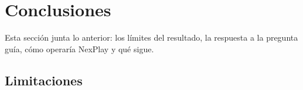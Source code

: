 \section{Conclusiones}\label{sec:conclusiones}

Esta sección junta lo anterior: los límites del resultado, la respuesta a la pregunta guía, cómo
operaría NexPlay y qué sigue.

\subsection{Limitaciones}\label{sec:limitaciones}

